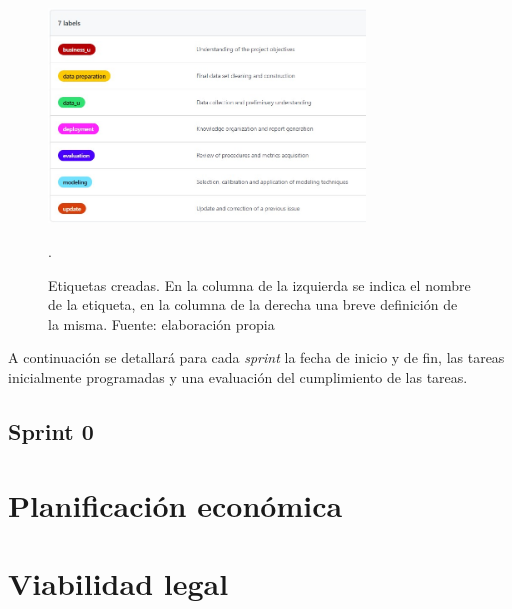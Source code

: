 \begin{figure}[h]
    \centering
    \includegraphics[width=0.75\textwidth]{img/labels_github.jpg}
    \caption{Etiquetas creadas. En la columna de la izquierda se indica el nombre de la etiqueta, en la columna de la derecha una breve definición de la misma. Fuente: elaboración propia}.
    \label{labels:github}
\end{figure}

A continuación se detallará para cada \textit{sprint} la fecha de inicio y de fin, las tareas inicialmente programadas y una evaluación del cumplimiento de las tareas.

\subsection{Sprint 0}

\section{Planificación económica}

\section{Viabilidad legal}